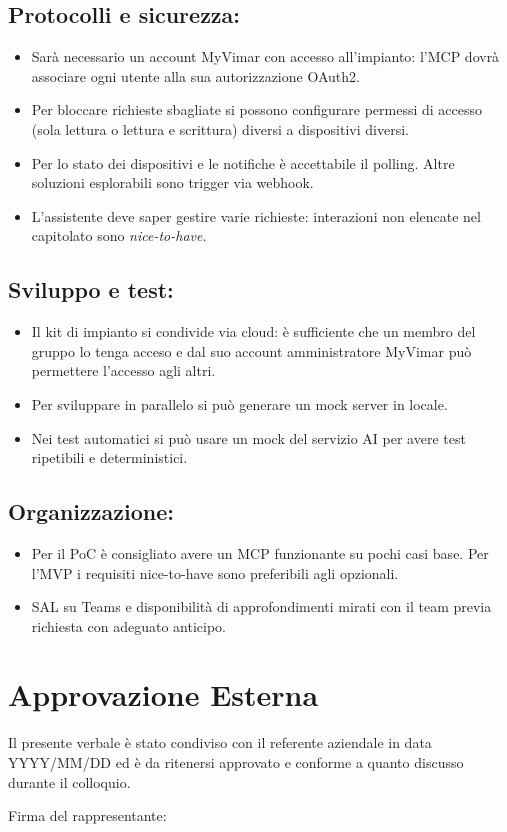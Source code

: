 \documentclass[a4paper, 11pt]{article}
\begin{document}
\subsection{Protocolli e sicurezza:}
\begin{itemize}
    \item Sarà necessario un account MyVimar con accesso all'impianto: l'MCP dovrà associare ogni utente alla sua autorizzazione OAuth2. \vspace{-0.1cm}
    \item Per bloccare richieste sbagliate si possono configurare permessi di accesso (sola lettura o lettura e scrittura) diversi a dispositivi diversi. \vspace{-0.1cm}
    \item Per lo stato dei dispositivi e le notifiche è accettabile il polling. Altre soluzioni esplorabili sono trigger via webhook. \vspace{-0.1cm}
    \item L'assistente deve saper gestire varie richieste: interazioni non elencate nel capitolato sono \textit{nice-to-have}. \vspace{-0.1cm}
\end{itemize}
\subsection{Sviluppo e test:}
\begin{itemize}
    \item Il kit di impianto si condivide via cloud: è sufficiente che un membro del gruppo lo tenga acceso e dal suo account amministratore MyVimar può permettere l'accesso agli altri.\vspace{-0.1cm}
    \item Per sviluppare in parallelo si può generare un mock server in locale. \vspace{-0.1cm}
    \item Nei test automatici si può usare un mock del servizio AI per avere test ripetibili e deterministici. \vspace{-0.1cm}
\end{itemize}
\subsection{Organizzazione:}
\begin{itemize}
    \item Per il PoC è consigliato avere un MCP funzionante su pochi casi base. Per l'MVP i requisiti nice-to-have sono preferibili agli opzionali. \vspace{-0.1cm}
    \item SAL su Teams e disponibilità di approfondimenti mirati con il team previa richiesta con adeguato anticipo. \vspace{-0.1cm}
\end{itemize}

\newpage


\section{Approvazione Esterna}

Il presente verbale è stato condiviso con il referente aziendale in data YYYY/MM/DD ed è da ritenersi approvato e conforme a quanto discusso durante il colloquio. 

\vspace{3cm}
Firma del rappresentante:
\end{document}
